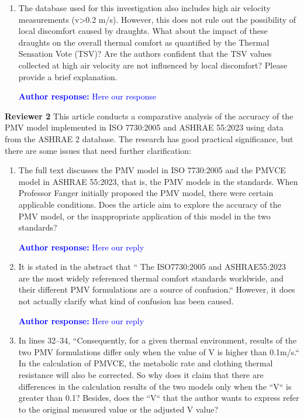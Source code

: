 \documentclass[a4paper, 10pt]{letter}
\newcommand{\response}[1]{\textcolor{blue}{\textbf{Author response:} #1}}
\begin{document}
\begin{letter}
\begin{enumerate}
            \response{
                Here our response
            }

            \item The database used for this investigation also includes high air velocity measurements (v>0.2 m/s).
            However, this does not rule out the possibility of local discomfort caused by draughts.
            What about the impact of these draughts on the overall thermal comfort as quantified by the Thermal Sensation Vote (TSV)? Are the authors confident that the TSV values collected at high air velocity are not influenced by local discomfort?
            Please provide a brief explanation.

            \response{
                Here our response
            }

        \end{enumerate}

        \clearpage

        \textbf{Reviewer 2}
        This article conducts a comparative analysis of the accuracy of the PMV model implemented in ISO 7730:2005 and ASHRAE 55:2023 using data from the ASHRAE 2 database.
        The research has good practical significance, but there are some issues that need further clarification:

        \begin{enumerate}
            \item The full text discusses the PMV model in ISO 7730:2005 and the PMVCE model in ASHRAE 55:2023, that is, the PMV models in the standards.
            When Professor Fanger initially proposed the PMV model, there were certain applicable conditions.
            Does the article aim to explore the accuracy of the PMV model, or the inappropriate application of this model in the two standards?

            \response{Here our reply}
            \item It is stated in the abstract that `` The ISO7730:2005 and ASHRAE55:2023 are the most widely referenced thermal comfort standards worldwide, and their different PMV formulations are a source of confusion.`` However, it does not actually clarify what kind of confusion has been caused.

            \response{Here our reply}

            \item In lines 32--34, ``Consequently, for a given thermal environment, results of the two PMV formulations differ only when the value of V is higher than 0.1m/s.`` In the calculation of PMVCE, the metabolic rate and clothing thermal resistance will also be corrected.
            So why does it claim that there are differences in the calculation results of the two models only when the ``V`` is greater than 0.1? Besides, does the ``V`` that the author wants to express refer to the original measured value or the adjusted V value?


\end{enumerate}
\end{letter}
\end{document}
